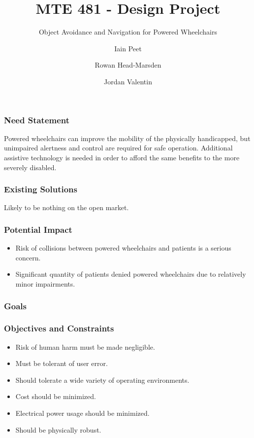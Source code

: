 \documentclass{beamer}
\title{MTE 481 - Design Project}
\subtitle{Object Avoidance and Navigation for Powered Wheelchairs}
\author{Iain Peet \and Rowan Head-Marsden \and Jordan Valentin}
\begin{document}
\begin{frame}
  \titlepage
\end{frame}

\begin{frame}
  \frametitle{Need Statement}
  Powered wheelchairs can improve the mobility of the physically handicapped, but 
  unimpaired alertness and control are required for safe operation.
  Additional assistive technology is needed in order to afford the same benefits
  to the more severely disabled.
\end{frame}

\begin{frame}
  \frametitle{Existing Solutions}
  Likely to be nothing on the open market.
\end{frame}

\begin{frame}
  \frametitle{Potential Impact}
  \begin{itemize}
    \item Risk of collisions between powered wheelchairs and patients is a serious concern. \\
    \item Significant quantity of patients denied powered wheelchairs due to relatively minor impairments. \\
  \end{itemize}
\end{frame}

\begin{frame}
  \frametitle{Goals}
\end{frame}

\begin{frame}
  \frametitle{Objectives and Constraints}
  \begin{itemize}
    \item Risk of human harm must be made negligible. \\
    \item Must be tolerant of user error. \\
    \item Should tolerate a wide variety of operating environments. \\
    \item Cost should be minimized. \\
    \item Electrical power usage should be minimized. \\
    \item Should be physically robust. \\
  \end{itemize}
\end{frame}
\end{document}
